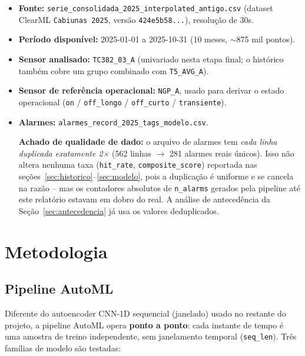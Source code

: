 \documentclass[11pt,a4paper]{article}
\begin{document}
\begin{itemize}
  \item \textbf{Fonte:} \texttt{serie\_consolidada\_2025\_interpolated\_antigo.csv}
        (dataset ClearML \texttt{Cabiunas 2025}, versão \texttt{424e5b58...}),
        resolução de 30s.
  \item \textbf{Período disponível:} 2025-01-01 a 2025-10-31 (10 meses,
        $\sim$875 mil pontos).
  \item \textbf{Sensor analisado:} \texttt{TC382\_03\_A} (univariado nesta
        etapa final; o histórico também cobre um grupo combinado com
        \texttt{T5\_AVG\_A}).
  \item \textbf{Sensor de referência operacional:} \texttt{NGP\_A}, usado para
        derivar o estado operacional (\texttt{on} / \texttt{off\_longo} /
        \texttt{off\_curto} / \texttt{transiente}).
  \item \textbf{Alarmes:} \texttt{alarmes\_record\_2025\_tags\_modelo.csv}.

  \textbf{Achado de qualidade de dado:} o arquivo de alarmes tem
  \emph{cada linha duplicada exatamente 2×} (562 linhas $\to$ 281 alarmes
  reais únicos). Isso não altera nenhuma taxa (\texttt{hit\_rate},
  \texttt{composite\_score}) reportada nas seções~\ref{sec:historico}--\ref{sec:modelo},
  pois a duplicação é uniforme e se cancela na razão -- mas os contadores
  absolutos de \texttt{n\_alarms} gerados pela pipeline até este relatório
  estavam em dobro do real. A análise de antecedência da
  Seção~\ref{sec:antecedencia} já usa os valores deduplicados.
\end{itemize}

\section{Metodologia}

\subsection{Pipeline AutoML}

Diferente do autoencoder CNN-1D sequencial (janelado) usado no restante do
projeto, a pipeline AutoML opera \textbf{ponto a ponto}: cada instante de
tempo é uma amostra de treino independente, sem janelamento temporal
(\texttt{seq\_len}). Três famílias de modelo são testadas:
\end{document}
